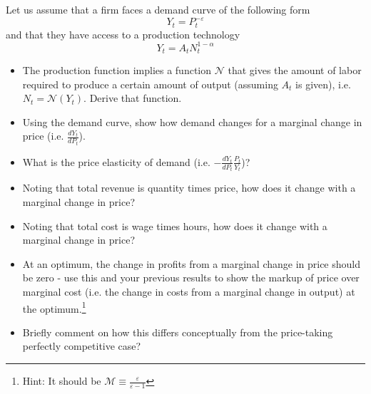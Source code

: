 \documentclass[authoryear,11pt]{elsarticle}
\begin{document}
\vspace{5mm}
Let us assume that a firm faces a demand curve of the following form
\[
Y_{t} = P_{t}^{-\varepsilon}
\]
and that they have access to a production technology
\[
Y_{t} = A_{t}N_{t}^{1-\alpha}
\]

\begin{itemize}
\item	The production function implies a function $\mathcal{N}$ that gives the amount of labor required to produce a certain amount of output (assuming $A_{t}$ is given), i.e. $N_{t} = \mathcal{N}(Y_{t})$. Derive that function.
\item	Using the demand curve, show how demand changes for a marginal change in price (i.e. $\frac{dY_{t}}{dP_{t}}$).
\item	What is the price elasticity of demand (i.e. $-\frac{dY_{t}}{dP_{t}}\frac{P_{t}}{Y_{t}}$)?
\item	Noting that total revenue is quantity times price, how does it change with a marginal change in price?
\item	Noting that total cost is wage times hours, how does it change with a marginal change in price?
\item	At an optimum, the change in profits from a marginal change in price should be zero - use this and your previous results to show the markup of price over marginal cost (i.e. the change in costs from a marginal change in output) at the optimum.\footnote{Hint: It should be $\mathcal{M}\equiv \frac{\varepsilon}{\varepsilon-1}$}
\item	Briefly comment on how this differs conceptually from the price-taking perfectly competitive case?
\end{itemize}
\end{document}
